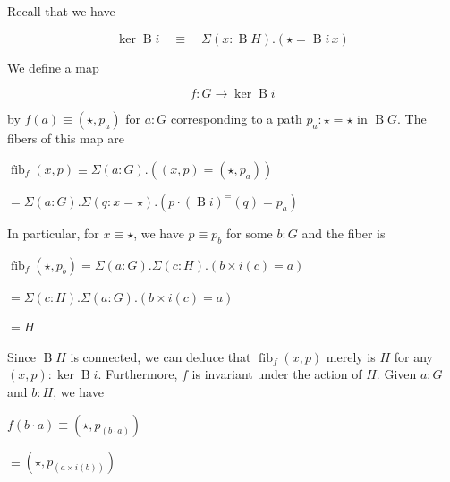 \documentclass[10pt,a4paper]{article}
\begin{document}
 
Recall that we have\par
  
\par  \quad  \[\ker\operatorname{B}i\quad\equiv\quad\Sigma(x:\operatorname{B}H).(\star=\operatorname{B}i\,x)\]\quad  \quad  
  
We define a map\par
  
\par  \quad  \[f:G\to\ker\operatorname{B}i\]\quad  \quad  
  
by $f(a)\equiv(\star,p_{a})$ for $a:G$ corresponding to a path $p_{a}:\star=\star$ in $\operatorname{B}G$. The fibers of this map are\par
  
\par  \quad  $\displaystyle\operatorname{fib}_{f}(x,p)$\quad  $\displaystyle\equiv\Sigma(a:G).((x,p)=(\star,p_{a}))$\quad  \quad  
 
\par  \quad  \quad  $\displaystyle=\Sigma(a:G).\Sigma(q:x=\star).(p\cdot(\operatorname{B}i)^{=}(q)=p_{a})$\quad  \quad  
  
In particular, for $x\equiv\star$, we have $p\equiv p_{b}$ for some $b:G$ and the fiber is\par
  
\par  \quad  $\displaystyle\operatorname{fib}_{f}(\star,p_{b})$\quad  $\displaystyle=\Sigma(a:G).\Sigma(c:H).(b\times i(c)=a)$\quad  \quad  
 
\par  \quad  \quad  $\displaystyle=\Sigma(c:H).\Sigma(a:G).(b\times i(c)=a)$\quad  \quad  
 
\par  \quad  \quad  $\displaystyle=H$\quad  \quad  
  
Since $\operatorname{B}H$ is connected, we can deduce that $\operatorname{fib}_{f}(x,p)$ merely is $H$ for any $(x,p):\ker\operatorname{B}i$. Furthermore, $f$ is invariant under the action of $H$. Given $a:G$ and $b:H$, we have\par
  
\par  \quad  $\displaystyle f(b\cdot a)$\quad  $\displaystyle\equiv(\star,p_{(b\cdot a)})$\quad  \quad  
 
\par  \quad  \quad  $\displaystyle\equiv(\star,p_{(a\times i(b))})$\quad  \quad  
 
\end{document}
